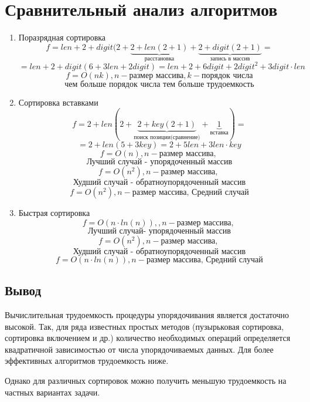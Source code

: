 \section{Сравнительный анализ алгоритмов}
	\begin{enumerate}
		\item Поразрядная сортировка 
		$$f=len + 2 + digit(2 +\underbrace{2 + len(2+1)}_{\text{расстановка}} + \underbrace{2 +digit(2+1)}_{\text{запись в массив}}=$$
		$$ = len+2 +digit(6+3len+2digit)=len+2+6digit+2digit^2+3digit\cdot len$$
		$$f = O(nk), n - \text{размер массива}, k- \text{порядок числа}$$
		$$\textbf{чем больше порядок числа тем больше трудоемкость}$$
		
		\item Сортировка вставками
		$$f=2+len(2+\underbrace{2+key(2+1)}_{\text{поиск позиции(сравнение)}}+\underbrace{1}_{\text{вставка}})=$$
		$$=2+len(5+3key)=2+5len+3len\cdot key$$
		$$f=O(n), n -\text{размер массива, }$$
        $$\text{Лучший случай - упорядоченный массив}$$
		$$f=O(n^2), n -\text{размер массива, }$$
        $$\text{Худший случай - обратноупорядоченный массив}$$
		$$f=O(n^2), n -\text{размер массива, }\text{Средний случай}$$
		
		\item Быстрая сортировка
		$$f=O(n \cdot ln(n)),, n -\text{размер массива, }$$
        $$\text{Лучший случай- упорядоченный массив}$$
		$$f=O(n^2), n -\text{размер массива, }$$
        $$\text{Худший случай - обратноупорядоченный массив}$$
		$$f=O(n \cdot ln(n)), n -\text{размер массива, }\text{Средний случай}$$
	\end{enumerate}
\subsection{Вывод}

	Вычислительная трудоемкость процедуры упорядочивания является достаточно высокой. Так, для ряда известных простых методов (пузырьковая сортировка, сортировка включением и др.) количество необходимых операций определяется квадратичной зависимостью от числа упорядочиваемых данных. Для более эффективных алгоритмов трудоемкость ниже. 
	
	Однако для различных сортировок можно получить меньшую трудоемкость на частных вариантах задачи.

